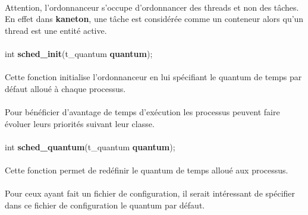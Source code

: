 \documentclass[10pt,a4wide]{article}
\begin{document}
\paragraph{}

Attention, l'ordonnanceur s'occupe d'ordonnancer des threads et non
des t\^aches. En effet dans \textbf{kaneton}, une t\^ache est consid\'er\'ee
comme un conteneur alors qu'un thread est une entit\'e active.

\paragraph{}

\hspace{1.5cm}int \textbf{sched\_init}(t\_quantum \textbf{quantum});

\paragraph{}

Cette fonction initialise l'ordonnanceur en lui sp\'ecifiant le quantum
de temps par d\'efaut allou\'e \`a chaque processus.

\paragraph{}

Pour b\'en\'eficier d'avantage de temps d'ex\'ecution les processus
peuvent faire \'evoluer leurs priorit\'es suivant leur classe.

\paragraph{}

\hspace{1.5cm}int \textbf{sched\_quantum}(t\_quantum \textbf{quantum});

\paragraph{}

Cette fonction permet de red\'efinir le quantum de temps allou\'e
aux processus.

\paragraph{}

Pour ceux ayant fait un fichier de configuration, il serait int\'eressant
de sp\'ecifier dans ce fichier de configuration le quantum par d\'efaut.
\end{document}
